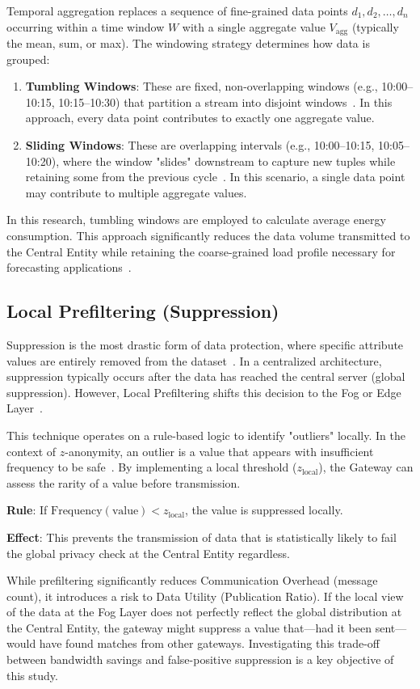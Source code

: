 Temporal aggregation replaces a sequence of fine-grained data points $d_1, d_2, \dots, d_n$ occurring within a time window $W$ with a single aggregate value $V_\text{agg}$ (typically the mean, sum, or max).
The windowing strategy determines how data is grouped:

\begin{enumerate}
    \item\textbf{Tumbling Windows}: These are fixed, non-overlapping windows (e.g., 10:00–10:15, 10:15–10:30) that partition a stream into disjoint windows~\cite{SlidingTumblingWindows}. In this approach, every data point contributes to exactly one aggregate value.


    \item\textbf{Sliding Windows}: These are overlapping intervals (e.g., 10:00–10:15, 10:05–10:20), where the window "slides" downstream to capture new tuples while retaining some from the previous cycle~\cite{SlidingTumblingWindows}. In this scenario, a single data point may contribute to multiple aggregate values.

\end{enumerate}
In this research, tumbling windows are employed to calculate average energy consumption. This approach significantly reduces the data volume transmitted to the Central Entity while retaining the coarse-grained load profile necessary for forecasting applications~\cite{DemandResponseSurvey}.

\subsection{Local Prefiltering (Suppression)}
Suppression is the most drastic form of data protection, where specific attribute values are entirely removed from the dataset~\cite{Sweeney_kanon}. In a centralized architecture, suppression typically occurs after the data has reached the central server (global suppression). However, Local Prefiltering shifts this decision to the Fog or Edge Layer~\cite{dezent2025}.

This technique operates on a rule-based logic to identify "outliers" locally. In the context of $z$-anonymity, an outlier is a value that appears with insufficient frequency to be safe~\cite{zanonDataStreams}. By implementing a local threshold ($z_{\text{local}}$), the Gateway can assess the rarity of a value before transmission.

\textbf{Rule}: If $\text{Frequency}(\text{value}) < z_{\text{local}}$, the value is suppressed locally.

\textbf{Effect}: This prevents the transmission of data that is statistically likely to fail the global privacy check at the Central Entity regardless.

While prefiltering significantly reduces Communication Overhead (message count), it introduces a risk to Data Utility (Publication Ratio). If the local view of the data at the Fog Layer does not perfectly reflect the global distribution at the Central Entity, the gateway might suppress a value that—had it been sent—would have found matches from other gateways. Investigating this trade-off between bandwidth savings and false-positive suppression is a key objective of this study.